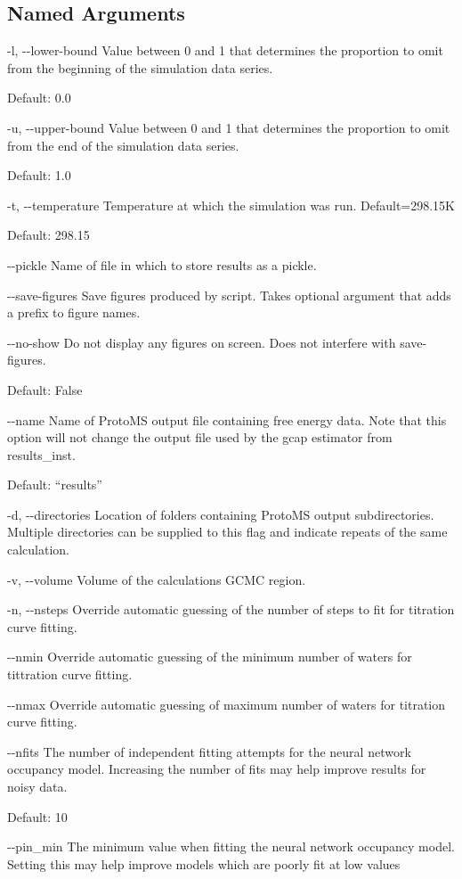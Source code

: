 \documentclass[letterpaper,10pt,english]{sphinxmanual}
\begin{document}
\subsection{Named Arguments}
\label{\detokenize{tools:Named Arguments}}\begin{optionlist}{3cm}
\item [-l, -{-}lower-bound]  
Value between 0 and 1 that determines the proportion to omit from the beginning of the simulation data series.

Default: 0.0
\item [-u, -{-}upper-bound]  
Value between 0 and 1 that determines the proportion to omit from the end of the simulation data series.

Default: 1.0
\item [-t, -{-}temperature]  
Temperature at which the simulation was run. Default=298.15K

Default: 298.15
\item [-{-}pickle]  
Name of file in which to store results as a pickle.
\item [-{-}save-figures]  
Save figures produced by script. Takes optional argument that adds a prefix to figure names.
\item [-{-}no-show]  
Do not display any figures on screen. Does not interfere with \textendash{}save-figures.

Default: False
\item [-{-}name]  
Name of ProtoMS output file containing free energy data. Note that this option will not change the output file used by the gcap estimator from results\_inst.

Default: “results”
\item [-d, -{-}directories]  
Location of folders containing ProtoMS output subdirectories. Multiple directories can be supplied to this flag and indicate repeats of the same calculation.
\item [-v, -{-}volume]  
Volume of the calculations GCMC region.
\item [-n, -{-}nsteps]  
Override automatic guessing of the number of steps to fit for titration curve fitting.
\item [-{-}nmin]  
Override automatic guessing of the minimum number of waters for tittration curve fitting.
\item [-{-}nmax]  
Override automatic guessing of maximum number of waters for titration curve fitting.
\item [-{-}nfits]  
The number of independent fitting attempts for the neural network occupancy model. Increasing the number of fits may help improve results for noisy data.

Default: 10
\item [-{-}pin\_min]  
The minimum value when fitting the neural network occupancy model. Setting this may help improve models which are poorly fit at low values
\end{optionlist}
\end{document}
